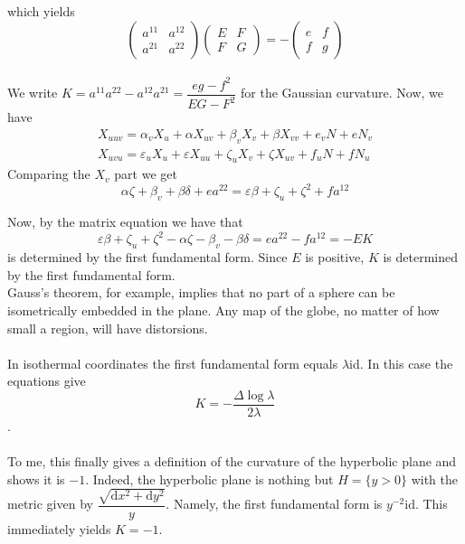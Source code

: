 \documentclass[english]{article}
\def\d{\text{d}}
\def\lap{\Delta}
\def\id{\text{id}}
\def\eps{\varepsilon}
\begin{document}
which yields
$$\left(\begin{array}{cc}
a^{11} & a^{12}\\
a^{21} & a^{22}
\end{array}\right)\left(\begin{array}{cc}
E & F\\
F & G
\end{array}\right)=-\left(\begin{array}{cc}
e & f\\
f & g
\end{array}\right)$$\\
We write $K=a^{11}a^{22}-a^{12}a^{21}=\dfrac{eg-f^2}{EG-F^2}$ for the Gaussian curvature. Now, we have
$$\begin{array}{c}
X_{uuv}=\alpha_{v}X_{u}+\alpha X_{uv}+\beta_{v}X_{v}+\beta X_{vv}+e_{v}N+eN_{v}\\
X_{uvu}=\eps_{u}X_{u}+\eps X_{uu}+\zeta_{u}X_{v}+\zeta X_{uv}+f_{u}N+fN_{u}
\end{array}$$
Comparing the $X_v$ part we get 
$$\alpha\zeta+\beta_{v}+\beta\delta+ea^{22}=\eps\beta+\zeta_{u}+\zeta^{2}+fa^{12}$$

Now, by the matrix equation we have that
$$\eps\beta+\zeta_{u}+\zeta^{2}-\alpha\zeta-\beta_{v}-\beta\delta=ea^{22}-fa^{12}=-EK$$
is determined by the first fundamental form. Since $E$ is positive, $K$ is determined by the first fundamental form.\\
Gauss's theorem, for example, implies that no part of a sphere can be isometrically embedded in the plane. Any map of the globe, no matter of how small a region, will have distorsions.
\\\\
In isothermal coordinates the first fundamental form equals $\lambda \id$. In this case the equations give $$K=-\dfrac{\lap \log \lambda}{2\lambda}$$.
\\\\
To me, this finally gives a definition of the curvature of the hyperbolic plane and shows it is $-1$. Indeed, the hyperbolic plane is nothing but $H=\{y>0\}$ with the metric given by $\dfrac{\sqrt{\d x^2+\d y^2}}{y}$. Namely, the first fundamental form is $y^{-2}\id$. This immediately yields $K=-1$.
\end{document}
